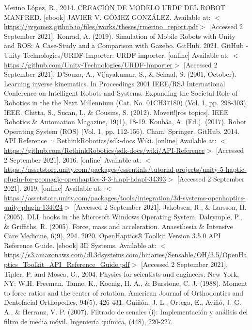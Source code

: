 \begin{thebibliography}{2}
	 Merino López, R., 2014. CREACIÓN DE MODELO URDF DEL ROBOT MANFRED. [ebook] JAVIER V. GÓMEZ GONZÁLEZ. Available at: $<$\url{https://jvgomez.github.io/files/works/theses/rmerino\_report.pdf}$>$ [Accessed 2 September 2021].
	 Konrad, A. (2019). Simulation of Mobile Robots with Unity and ROS: A Case-Study and a Comparison with Gazebo.
	 GitHub. 2021. GitHub - Unity-Technologies/URDF-Importer: URDF importer. [online] Available at: $<$\url{https://github.com/Unity-Technologies/URDF-Importer}$>$ [Accessed 2 September 2021].
	 D'Souza, A., Vijayakumar, S., \& Schaal, S. (2001, October). Learning inverse kinematics. In Proceedings 2001 IEEE/RSJ International Conference on Intelligent Robots and Systems. Expanding the Societal Role of Robotics in the the Next Millennium (Cat. No. 01CH37180) (Vol. 1, pp. 298-303). IEEE.
	 Chitta, S., Sucan, I., \& Cousins, S. (2012). Moveit![ros topics]. IEEE Robotics \& Automation Magazine, 19(1), 18-19.
	 Koubâa, A. (Ed.). (2017). Robot Operating System (ROS) (Vol. 1, pp. 112-156). Cham: Springer.
	 GitHub. 2014. API Reference · RethinkRobotics/sdk-docs Wiki. [online] Available at: $<$\url{https://github.com/RethinkRobotics/sdk-docs/wiki/API-Reference}$>$ [Accessed 2 September 2021].
	 2016. [online] Available at: $<$\url{https://assetstore.unity.com/packages/essentials/tutorial-projects/unity-5-haptic-plugin-for-geomagic-openhaptics-3-3-hlapi-hdapi-34393}$>$ [Accessed 2 September 2021].
	 2019. [online] Available at: $<$\url{https://assetstore.unity.com/packages/tools/integration/3d-systems-openhaptics-unity-plugin-134024}$>$ [Accessed 2 September 2021].
	 Jakobsen, R., \& Larsson, H. (2005). DLL hooks in the Microsoft Windows Operating System.
	 Dalrymple, P., \& Griffiths, R. (2005). Force, mass and acceleration. Anaesthesia \& Intensive Care Medicine, 6(9), 294.
	 2020. OpenHaptics® Toolkit Version 3.5.0 API Reference Guide. [ebook] 3D Systems. Available at: $<$\url{https://s3.amazonaws.com/dl.3dsystems.com/binaries/Sensable/OH/3.5/OpenHaptics\_Toolkit\_API\_Reference\_Guide.pdf}$>$ [Accessed 2 September 2021].
	 Tipler, P. and Mosca, G., 2004. Physics for scientists and engineers. New York, NY: W.H. Freeman.
	 Tanne, K., Koenig, H. A., \& Burstone, C. J. (1988). Moment to force ratios and the center of rotation. American Journal of Orthodontics and Dentofacial Orthopedics, 94(5), 426-431.
	 Guiñón, J. L., Ortega, E., Aviñó, J. G. A., \& Herranz, V. P. (2007). Filtrado de senales (i): Implementación y análisis del filtro de media móvil. Ingeniería química, (448), 220-227.

\end{thebibliography}
